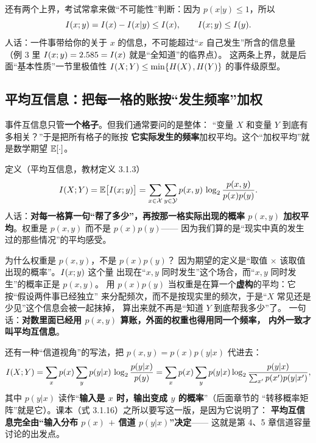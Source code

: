 还有两个上界，考试常拿来做“不可能性”判断：因为 $p(x|y)\le1$，所以
\[
I\!\left(x;y\right)=I(x)-I(x|y)\le I(x),\qquad
I\!\left(x;y\right)\le I(y).
\]
人话：一件事带给你的关于 $x$ 的信息，不可能超过“$x$ 自己发生”所含的信息量
（例 3 里 $I\!\left(x;y\right)=2.585=I(x)$ 就是“全知道”的临界点）。
这两条上界，就是后面“基本性质”一节里极值性 $I\!\left(X;Y\right)\le\min\{H\!\left(X\right),H\!\left(Y\right)\}$ 的事件级原型。

\subsection{平均互信息：把每一格的账按“发生频率”加权}

事件互信息只管\textbf{一个格子}。但我们通常要问的是整体：
“变量 $X$ 和变量 $Y$ 到底有多相关？”于是把所有格子的账按
\textbf{它实际发生的频率}加权平均。这个“加权平均”就是数学期望 $\operatorname{\mathbb{E}}[\cdot]$。

\begin{defbox}{定义（平均互信息，教材定义 3.1.3）}
\[
I\!\left(X;Y\right)=\operatorname{\mathbb{E}}\bigl[I\!\left(x;y\right)\bigr]
=\sum_{x\in\mathcal X}\sum_{y\in\mathcal Y} p(x,y)\,\log_{2}\frac{p(x,y)}{p(x)p(y)} .
\]
人话：\textbf{对每一格算一句“帮了多少”，再按那一格实际出现的概率
$p(x,y)$ 加权平均}。权重是 $p(x,y)$ 而不是 $p(x)p(y)$——
因为我们算的是“现实中真的发生过的那些情况”的平均感受。
\end{defbox}

\begin{qa}{为什么权重是 $p(x,y)$，不是 $p(x)p(y)$？}
因为期望的定义是“取值 $\times$ 该取值出现的概率”。$I\!\left(x;y\right)$ 这个量
出现在“$x,y$ 同时发生”这个场合，而“$x,y$ 同时发生”的概率正是 $p(x,y)$。
用 $p(x)p(y)$ 当权重是在算一个\textbf{虚构}的平均：它按“假设两件事已经独立”
来分配频次，而不是按现实里的频次，于是“$X$ 常见还是少见”这个信息会被一起抹掉，
算出来就不再是“知道 $Y$ 到底帮我多少”了。
一句话：\textbf{对数里面已经用 $p(x,y)$ 算账，外面的权重也得用同一个频率，
内外一致才叫平均互信息}。
\end{qa}

还有一种“信道视角”的写法，把 $p(x,y)=p(x)p(y|x)$ 代进去：
\[
I\!\left(X;Y\right)=\sum_{x}p(x)\sum_{y}p(y|x)\,\log_{2}\frac{p(y|x)}{p(y)}
=\sum_{x}p(x)\sum_{y}p(y|x)\log_{2}\frac{p(y|x)}{\sum_{x'}p(x')p(y|x')},
\]
其中 $p(y|x)$ 读作“\textbf{输入是 $x$ 时，输出变成 $y$ 的概率}”（后面章节的
“转移概率矩阵”就是它）。课本（式 3.1.16）之所以要写这一版，是因为它说明了：
\textbf{平均互信息完全由“输入分布 $p(x)$ $+$ 信道 $p(y|x)$”决定}——
这就是第 4、5 章信道容量讨论的出发点。

